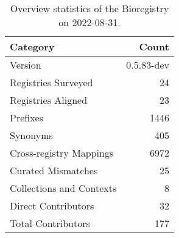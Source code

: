 \begin{table}
\centering
\caption{Overview statistics of the Bioregistry on 2022-08-31.}
\label{tab:bioregistry-summary}
\begin{tabular}{lr}
\toprule
                Category &      Count \\
\midrule
                 Version & 0.5.83-dev \\
     Registries Surveyed &         24 \\
      Registries Aligned &         23 \\
                Prefixes &       1446 \\
                Synonyms &        405 \\
 Cross-registry Mappings &       6972 \\
      Curated Mismatches &         25 \\
Collections and Contexts &          8 \\
     Direct Contributors &         32 \\
      Total Contributors &        177 \\
\bottomrule
\end{tabular}
\end{table}
